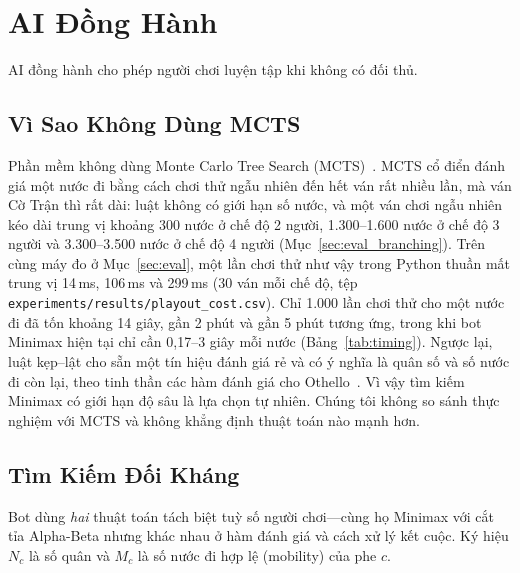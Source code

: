 \section{AI Đồng Hành}
\label{sec:ai}

AI đồng hành cho phép người chơi luyện tập khi không có đối thủ.

\subsection{Vì Sao Không Dùng MCTS}

Phần mềm không dùng Monte Carlo Tree Search (MCTS)~\citep{browne2012survey}.
MCTS cổ điển đánh giá một nước đi bằng cách chơi thử ngẫu nhiên đến hết ván
rất nhiều lần, mà ván Cờ Trận thì rất dài: luật không có giới hạn số nước,
và một ván chơi ngẫu nhiên kéo dài trung vị khoảng 300 nước ở chế độ 2
người, 1.300--1.600 nước ở chế độ 3 người và 3.300--3.500 nước ở chế độ 4
người (Mục~\ref{sec:eval_branching}). Trên cùng máy đo ở
Mục~\ref{sec:eval}, một lần chơi thử như vậy trong Python thuần mất trung vị
14\,ms, 106\,ms và 299\,ms (30 ván mỗi chế độ, tệp
\texttt{experiments/results/playout\_cost.csv}). Chỉ 1.000 lần chơi thử cho
một nước đi đã tốn khoảng 14 giây, gần 2 phút và gần 5 phút tương ứng, trong khi bot Minimax
hiện tại chỉ cần 0,17--3 giây mỗi nước (Bảng~\ref{tab:timing}). Ngược lại,
luật kẹp--lật cho sẵn một tín hiệu đánh giá rẻ và có ý nghĩa là quân số và
số nước đi còn lại, theo tinh thần các hàm đánh giá cho
Othello~\citep{buro1999how}. Vì vậy tìm kiếm Minimax có giới hạn độ sâu là
lựa chọn tự nhiên. Chúng tôi không so sánh thực nghiệm với MCTS và không
khẳng định thuật toán nào mạnh hơn.

\subsection{Tìm Kiếm Đối Kháng}
\label{ssec:search}

Bot dùng \emph{hai} thuật toán tách biệt tuỳ số người chơi---cùng họ
Minimax với cắt tỉa Alpha-Beta nhưng khác nhau ở hàm đánh giá và cách xử
lý kết cuộc. Ký hiệu $N_c$ là số quân và $M_c$ là số nước đi hợp lệ
(mobility) của phe $c$.

